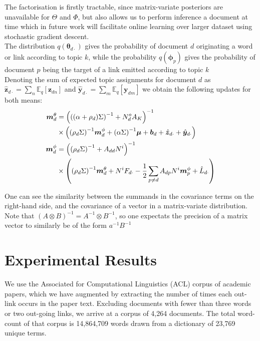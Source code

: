 \documentclass{sciposter}
\newcommand \ex[2] {
    \mathbb{E}_{ { #2 } }\left[ #1 \right]
}
\newcommand \halve[1] {
	\frac{#1}{2}
}
\newcommand \half {
    \halve{1}
}
\newcommand \vv[1] { \bm #1 }
\newcommand \inv[1] { {#1}^{-1} }
\newcommand \invb[1] { \inv{\left( #1 \right)} }
\newcommand \thdo { { \vv{\theta}_{d\cdot} } }
\begin{document}
\begin{multicols}{3}
The factorisation is firstly tractable, since matrix-variate posteriors are unavailable for $\Theta$ and $\Phi$, but also allows us to perform inference a document at time which in future work will facilitate online learning over larger dataset using stochastic gradient descent. \\

The distribution $q(\thdo)$ gives the probability of document $d$ originating a word or link according to topic $k$, while the probability $q(\vv{\phi}_p)$ gives the probability of document $p$ being the target of a link emitted according to topic $k$\\

Denoting the sum of expected topic assignments for document $d$ as $\hat{\vv{z}}_{d\cdot} = \sum_n \ex{\vv{z}_{dn}}{q}$ and $\hat{\vv{y}}_{d\cdot} = \sum_m \ex{\vv{y}_{dm}}{q}$ we obtain the following updates for both means:
\begin{align*}
\mtd &= \invb{ \invb{(\alpha + \rho_d)\Sigma} + N^o_d A_K } \\
    & \times
            \left(
                \invb{\rho_d \Sigma} \mpd
                + \invb{\alpha \Sigma}\vv{\mu}
                + \vv{b}_d 
                + \hat{\vv{z}}_{d\cdot}
                + \hat{\vv{y}}_{d\cdot}
            \right) \\
 \mpd & = \invb{\invb{\rho_d \Sigma} + A_{dd}N^i} \\
  & \times
             \left(
                 \invb{\rho_d \Sigma}\mtd + N^i F_{d\cdot} -\half \sum_{p \neq d} A_{dp} N^i \vv{m}^\phi_p + \hat{L}_{d\cdot}
             \right)
 \end{align*}
 
One can see the similarity between the summands in the covariance terms on the right-hand side, and the covariance of a vector in a matrix-variate distribution. Note that $\invb{A\otimes B} = \inv{A} \otimes \inv{B}$, so one expectats the precision of a matrix vector to similarly be of the form $\inv{a}\inv{B}$

\section{Experimental Results}

We use the Associated for Computational Linguistics (ACL) corpus of academic papers, which we have augmented by extracting the number of times each out-link occurs in the paper text. Excluding documents with fewer than three words or two out-going links, we arrive at a corpus of 4,264 documents. The total word-count of that corpus is 14,864,709 words drawn from a dictionary of 23,769 unique terms.


\end{multicols}
\end{document}
